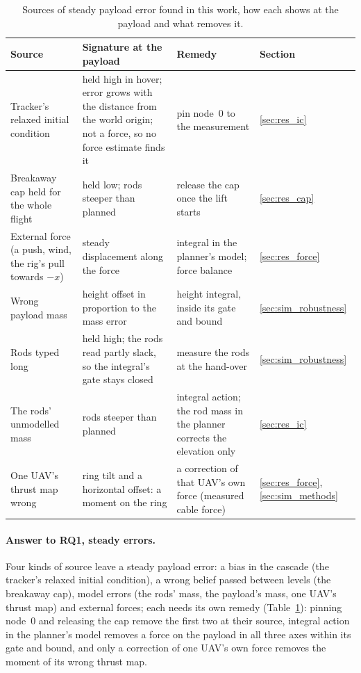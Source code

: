 \begin{table}[h]
\centering
\footnotesize
\caption{Sources of steady payload error found in this work, how each shows at the payload and what
removes it.}
\label{tab:error_sources}
\begin{tabularx}{\textwidth}{>{\raggedright\arraybackslash}p{3.2cm}>{\raggedright\arraybackslash}X>{\raggedright\arraybackslash}Xl}
\toprule
Source & Signature at the payload & Remedy & Section \\
\midrule
Tracker's relaxed initial condition & held high in hover; error grows with the distance from the world
origin; not a force, so no force estimate finds it & pin node~0 to the measurement & \ref{sec:res_ic} \\ \addlinespace
Breakaway cap held for the whole flight & held low; rods steeper than planned & release the cap once
the lift starts & \ref{sec:res_cap} \\ \addlinespace
External force (a push, wind, the rig's pull towards $-x$) & steady displacement along the force &
integral in the planner's model; force balance & \ref{sec:res_force} \\ \addlinespace
Wrong payload mass & height offset in proportion to the mass error & height integral, inside its gate
and bound & \ref{sec:sim_robustness} \\ \addlinespace
Rods typed long & held high; the rods read partly slack, so the integral's gate stays closed & measure
the rods at the hand-over & \ref{sec:sim_robustness} \\ \addlinespace
The rods' unmodelled mass & rods steeper than planned & integral action; the rod mass in the planner
corrects the elevation only & \ref{sec:res_ic} \\ \addlinespace
One UAV's thrust map wrong & ring tilt and a horizontal offset: a moment on the ring & a correction of
that UAV's own force (measured cable force) & \ref{sec:res_force}, \ref{sec:sim_methods} \\
\bottomrule
\end{tabularx}
\end{table}

\paragraph{Answer to RQ1, steady errors.} Four kinds of source leave a steady payload error: a bias in the cascade (the
tracker's relaxed initial condition), a wrong belief passed between levels (the breakaway cap), model
errors (the rods' mass, the payload's mass, one UAV's thrust map) and external forces; each needs its own
remedy (Table~\ref{tab:error_sources}): pinning node~0 and releasing the cap remove the first two at
their source, integral action in the planner's model removes a force on the payload in all three axes
within its gate and bound, and only a correction of one UAV's own force removes the moment of its wrong
thrust map.
